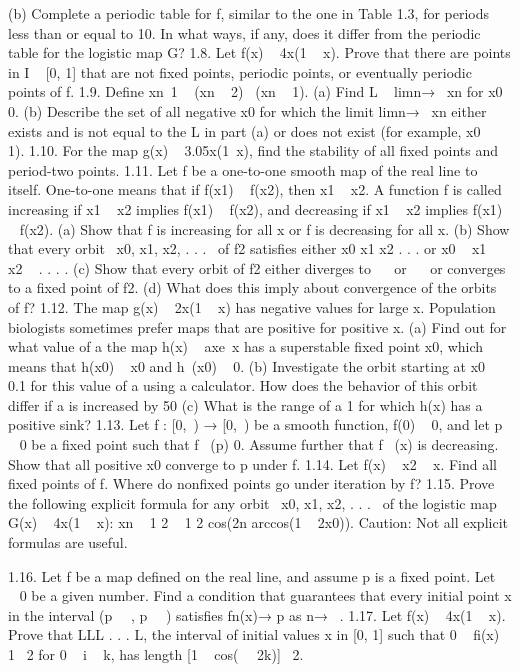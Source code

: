 \documentclass{article}
\begin{document}
(b) Complete a periodic table for f, similar to the one in Table 1.3, for periods
less than or equal to 10. In what ways, if any, does it differ from the periodic
table for the logistic map G?
1.8. Let f(x)   4x(1   x). Prove that there are points in I   [0, 1] that are not fixed
points, periodic points, or eventually periodic points of f.
1.9. Define xn 1   (xn   2)  (xn   1).
(a) Find L   limn→  xn for x0 
 0.
(b) Describe the set of all negative x0 for which the limit limn→  xn either exists
and is not equal to the L in part (a) or does not exist (for example, x0    1).
1.10. For the map g(x)   3.05x(1 x), find the stability of all fixed points and period-two
points.
1.11. Let f be a one-to-one smooth map of the real line to itself. One-to-one means that
if f(x1)   f(x2), then x1   x2. A function f is called increasing if x1   x2 implies
f(x1)   f(x2), and decreasing if x1   x2 implies f(x1)   f(x2).
(a) Show that f is increasing for all x or f is decreasing for all x.
(b) Show that every orbit  x0, x1, x2, . . .  of f2 satisfies either x0 
 x1 
 x2 
 . . .
or x0   x1   x2   . . . .
(c) Show that every orbit of f2 either diverges to    or    or converges to a
fixed point of f2.
(d) What does this imply about convergence of the orbits of f?
1.12. The map g(x)   2x(1   x) has negative values for large x. Population biologists
sometimes prefer maps that are positive for positive x.
(a) Find out for what value of a the map h(x)   axe x has a superstable fixed
point x0, which means that h(x0)   x0 and h (x0)   0.
(b) Investigate the orbit starting at x0   0.1 for this value of a using a calculator.
How does the behavior of this orbit differ if a is increased by 50%
(c) What is the range of a 
 1 for which h(x) has a positive sink?
1.13. Let f : [0, ) → [0, ) be a smooth function, f(0)   0, and let p   0 be a fixed
point such that f  (p) 
 0. Assume further that f  (x) is decreasing. Show that all
positive x0 converge to p under f.
1.14. Let f(x)   x2   x. Find all fixed points of f. Where do nonfixed points go under
iteration by f?
1.15. Prove the following explicit formula for any orbit  x0, x1, x2, . . .  of the logistic map
G(x)   4x(1   x):
xn  
1
2
 
1
2
cos(2n arccos(1   2x0)).
Caution: Not all explicit formulas are useful.

1.16. Let f be a map defined on the real line, and assume p is a fixed point. Let     0 be
a given number. Find a condition that guarantees that every initial point x in the
interval (p   , p   ) satisfies fn(x)→ p as n→  .
1.17. Let f(x)   4x(1   x). Prove that LLL . . . L, the interval of initial values x in [0, 1]
such that 0   fi(x)   1  2 for 0   i   k, has length [1   cos(   2k)]  2.
\end{document}
